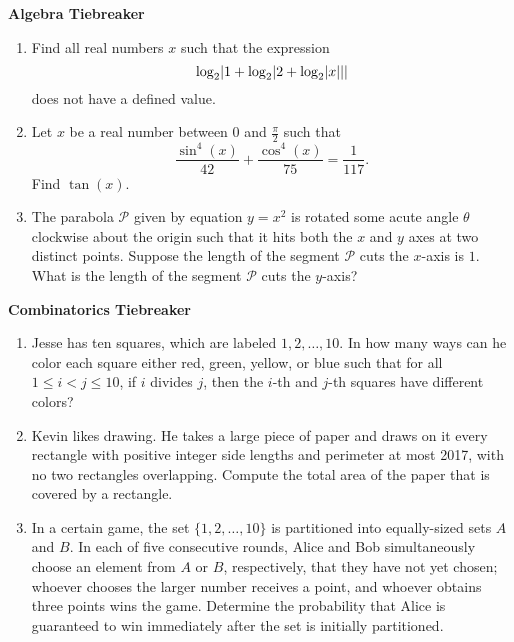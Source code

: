 \documentclass[10pt]{article}
\newcounter{enum}
\DeclarePairedDelimiter\abs{\lvert}{\rvert}
\begin{document}
\begin{center}
\huge\textbf{Algebra Tiebreaker}
\end{center}

\begin{enumerate}
	\item Find all real numbers $x$ such that the expression
\[\log_2 \abs{1 + \log_2 \abs{2 + \log_2 \abs{x}}}\]
does not have a defined value.
	
	\item Let $x$ be a real number between $0$ and $\tfrac{\pi}2$ such that \[\dfrac{\sin^4(x)}{42}+\dfrac{\cos^4(x)}{75} = \dfrac{1}{117}.\] Find $\tan(x)$.
	
	\item The parabola $\mathcal P$ given by equation $y=x^2$ is rotated some acute angle $\theta$ clockwise about the origin such that it hits both the $x$ and $y$ axes at two distinct points.  Suppose the length of the segment $\mathcal P$ cuts the $x$-axis is $1$.  What is the length of the segment $\mathcal P$ cuts the $y$-axis?
	
\end{enumerate}

\newpage

\begin{center}
\huge\textbf{Combinatorics Tiebreaker}
\end{center}

\begin{enumerate}

\item Jesse has ten squares, which are labeled $1, 2, \dots, 10$. In how many ways can he color each square either red, green, yellow, or blue such that for all $1 \le i < j \le 10$, if $i$ divides $j$, then the $i$-th and $j$-th squares have different colors?

\item Kevin likes drawing. He takes a large piece of paper and draws on it every rectangle with positive integer side lengths and perimeter at most 2017, with no two rectangles overlapping. Compute the total area of the paper that is covered by a rectangle.

\item In a certain game, the set $\{1, 2, \dots, 10\}$ is partitioned into equally-sized sets $A$ and $B$. In each of five consecutive rounds, Alice and Bob simultaneously choose an element from $A$ or $B$, respectively, that they have not yet chosen; whoever chooses the larger number receives a point, and whoever obtains three points wins the game. Determine the probability that Alice is guaranteed to win immediately after the set is initially partitioned.

\end{enumerate}
\end{document}
